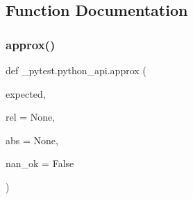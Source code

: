 \subsection{Function Documentation}
\mbox{\label{namespace__pytest_1_1python__api_a70e8904dd5c406d57f3cb4897d02830c}} 
\subsubsection{\texorpdfstring{approx()}{approx()}}
{\footnotesize\ttfamily def \+\_\+pytest.\+python\+\_\+api.\+approx (\begin{DoxyParamCaption}\item[{}]{expected,  }\item[{}]{rel = {\ttfamily None},  }\item[{}]{abs = {\ttfamily None},  }\item[{}]{nan\+\_\+ok = {\ttfamily False} }\end{DoxyParamCaption})}

